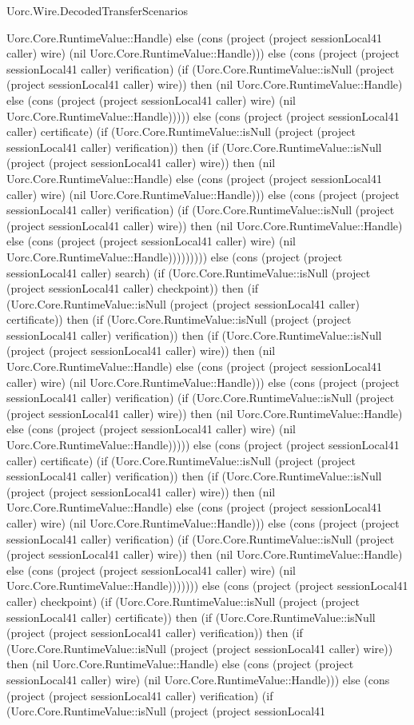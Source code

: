 \begin{lexlean}{Uorc.Wire.DecodedTransferScenarios}
\begin{semanticmodule}
{Uorc.Core.RuntimeValue::Handle) else (cons (project (project sessionLocal41 caller) wire) (nil Uorc.Core.RuntimeValue::Handle))) else (cons (project (project sessionLocal41 caller) verification) (if (Uorc.Core.RuntimeValue::isNull (project (project sessionLocal41 caller) wire)) then (nil Uorc.Core.RuntimeValue::Handle) else (cons (project (project sessionLocal41 caller) wire) (nil Uorc.Core.RuntimeValue::Handle))))) else (cons (project (project sessionLocal41 caller) certificate) (if (Uorc.Core.RuntimeValue::isNull (project (project sessionLocal41 caller) verification)) then (if (Uorc.Core.RuntimeValue::isNull (project (project sessionLocal41 caller) wire)) then (nil Uorc.Core.RuntimeValue::Handle) else (cons (project (project sessionLocal41 caller) wire) (nil Uorc.Core.RuntimeValue::Handle))) else (cons (project (project sessionLocal41 caller) verification) (if (Uorc.Core.RuntimeValue::isNull (project (project sessionLocal41 caller) wire)) then (nil Uorc.Core.RuntimeValue::Handle) else (cons (project (project sessionLocal41 caller) wire) (nil Uorc.Core.RuntimeValue::Handle))))))))) else (cons (project (project sessionLocal41 caller) search) (if (Uorc.Core.RuntimeValue::isNull (project (project sessionLocal41 caller) checkpoint)) then (if (Uorc.Core.RuntimeValue::isNull (project (project sessionLocal41 caller) certificate)) then (if (Uorc.Core.RuntimeValue::isNull (project (project sessionLocal41 caller) verification)) then (if (Uorc.Core.RuntimeValue::isNull (project (project sessionLocal41 caller) wire)) then (nil Uorc.Core.RuntimeValue::Handle) else (cons (project (project sessionLocal41 caller) wire) (nil Uorc.Core.RuntimeValue::Handle))) else (cons (project (project sessionLocal41 caller) verification) (if (Uorc.Core.RuntimeValue::isNull (project (project sessionLocal41 caller) wire)) then (nil Uorc.Core.RuntimeValue::Handle) else (cons (project (project sessionLocal41 caller) wire) (nil Uorc.Core.RuntimeValue::Handle))))) else (cons (project (project sessionLocal41 caller) certificate) (if (Uorc.Core.RuntimeValue::isNull (project (project sessionLocal41 caller) verification)) then (if (Uorc.Core.RuntimeValue::isNull (project (project sessionLocal41 caller) wire)) then (nil Uorc.Core.RuntimeValue::Handle) else (cons (project (project sessionLocal41 caller) wire) (nil Uorc.Core.RuntimeValue::Handle))) else (cons (project (project sessionLocal41 caller) verification) (if (Uorc.Core.RuntimeValue::isNull (project (project sessionLocal41 caller) wire)) then (nil Uorc.Core.RuntimeValue::Handle) else (cons (project (project sessionLocal41 caller) wire) (nil Uorc.Core.RuntimeValue::Handle))))))) else (cons (project (project sessionLocal41 caller) checkpoint) (if (Uorc.Core.RuntimeValue::isNull (project (project sessionLocal41 caller) certificate)) then (if (Uorc.Core.RuntimeValue::isNull (project (project sessionLocal41 caller) verification)) then (if (Uorc.Core.RuntimeValue::isNull (project (project sessionLocal41 caller) wire)) then (nil Uorc.Core.RuntimeValue::Handle) else (cons (project (project sessionLocal41 caller) wire) (nil Uorc.Core.RuntimeValue::Handle))) else (cons (project (project sessionLocal41 caller) verification) (if (Uorc.Core.RuntimeValue::isNull (project (project sessionLocal41 }
\end{semanticmodule}
\end{lexlean}
